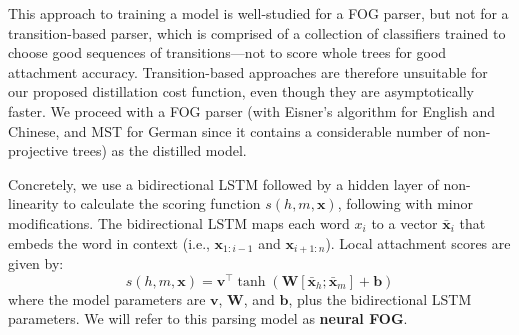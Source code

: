 \documentclass[11pt,letterpaper]{article}
\newcommand{\ignore}[1]{}
\newcommand{\cjd}[1]{\textcolor{cyan}{\ignore{{\textbf{[#1 --\textsc{cjd}]}}}}}
\newcommand{\nascomment}[1]{\ignore{\textcolor{blue}{{\textbf{[#1 --\textsc{nas}]}}}}}
\newcommand{\miguelcomment}[1]{\ignore{\textcolor{red}{{\textbf{[#1 --\textsc{miguel}]}}}}}
\begin{document}
This approach to training a model is well-studied for a FOG parser, but not for a  transition-based parser, which is comprised of a collection of classifiers trained to choose good sequences of transitions---not to score whole trees for good attachment accuracy. Transition-based approaches are therefore unsuitable for our proposed distillation cost function, even though they are asymptotically faster. \ignore{\nascomment{might want to discuss more here.}} \ignore{\miguelcomment{why do we relate to transntion-based parsers here?}}We proceed with a FOG parser (with Eisner's algorithm for English and Chinese, and MST for German since it contains a considerable number of non-projective trees)\ignore{\miguelcomment{explain why mst for german and eisner's for the rest...}} as the distilled model.

\ignore{\nascomment{I cut the citation to \newcite{label_bias}; it is not well studied for parsing and maybe better to leave out}}






\ignore{\cjd{things to do: discuss Hinton's intuitions for what kind of information is important to capture in distillation. recap it here. explain how your cost function captures this. Not all mistakes are equally as good. Second, why are we using a graph-based parsing model and why are we not using cross entropy? The answer is that we care about attachment accuracy, and we want to optimize it. Transition based models are easiest to train to maximize the probability of the sequence of actions, but we want to be able to reason about scores of different complete parses. Arc-factored models have very simple inference and directly model ``attachment'', so it's a good fit.} \nascomment{leaving Chris's comment to make sure this is done to his satisfaction}}

Concretely, we use a bidirectional LSTM followed by a hidden layer of non-linearity to calculate the scoring function $s(h, m, \boldsymbol{x})$, following  with minor modifications. 
The bidirectional LSTM maps each word $x_i$ to a vector $\mathbf{\bar{x}}_i$ that embeds the word in context (i.e., $\boldsymbol{x}_{1:i-1}$ and $\boldsymbol{x}_{i+1:n}$).  Local attachment scores are given by:
\begin{equation}
s(h, m, \boldsymbol{x}) = \mathbf{v}^\top \tanh\left ( \mathbf{W} [\mathbf{\bar{x}}_h ; \mathbf{\bar{x}}_m ] + \mathbf{b} \right)
\end{equation}
where the model parameters are $\mathbf{v}$, $\mathbf{W}$, and $\mathbf{b}$, plus the bidirectional LSTM parameters.
We will refer to this parsing model as \textbf{neural FOG}.
\end{document}
